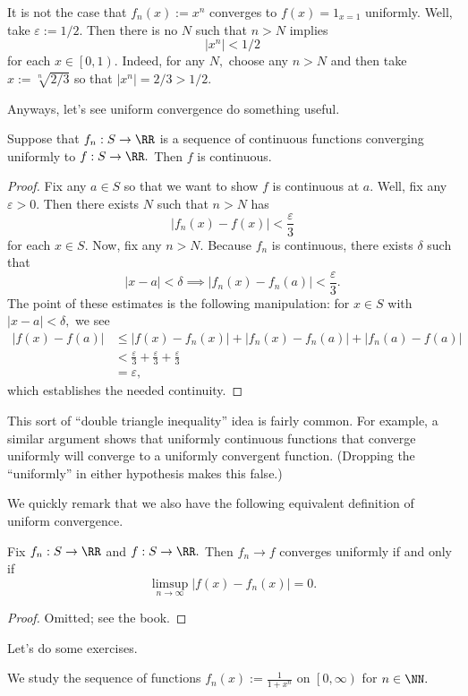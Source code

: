 \begin{nex}
	It is not the case that $f_n(x):=x^n$ converges to $f(x)=1_{x=1}$ uniformly. Well, take $\varepsilon:=1/2.$ Then there is no $N$ such that $n>N$ implies
	\[\left|x^n\right|<1/2\]
	for each $x\in\left[0,1\right).$ Indeed, for any $N,$ choose any $n>N$ and then take $x:=\sqrt[n]{2/3}$ so that $|x^n|=2/3>1/2.$
\end{nex}
Anyways, let's see uniform convergence do something useful.
\begin{proposition}
	Suppose that $f_n:S\to\RR$ is a sequence of continuous functions converging uniformly to $f:S\to\RR.$ Then $f$ is continuous.
\end{proposition}
\begin{proof}
	Fix any $a\in S$ so that we want to show $f$ is continuous at $a.$ Well, fix any $\varepsilon>0.$ Then there exists $N$ such that $n>N$ has
	\[|f_n(x)-f(x)|<\frac\varepsilon3\]
	for each $x\in S.$ Now, fix any $n>N.$ Because $f_n$ is continuous, there exists $\delta$ such that
	\[|x-a|<\delta\implies|f_n(x)-f_n(a)|<\frac\varepsilon3.\]
	The point of these estimates is the following manipulation: for $x\in S$ with $|x-a|<\delta,$ we see
	\begin{align*}
		|f(x)-f(a)| &\le |f(x)-f_n(x)|+|f_n(x)-f_n(a)|+|f_n(a)-f(a)| \\
		&< \frac\varepsilon3+\frac\varepsilon3+\frac\varepsilon3 \\
		&=\varepsilon,
	\end{align*}
	which establishes the needed continuity.
\end{proof}
\begin{remark}
	This sort of ``double triangle inequality'' idea is fairly common. For example, a similar argument shows that uniformly continuous functions that converge uniformly will converge to a uniformly convergent function. (Dropping the ``uniformly'' in either hypothesis makes this false.)
\end{remark}
We quickly remark that we also have the following equivalent definition of uniform convergence.
\begin{proposition}
	Fix $f_n:S\to\RR$ and $f:S\to\RR.$ Then $f_n\to f$ converges uniformly if and only if
	\[\limsup_{n\to\infty}|f(x)-f_n(x)|=0.\]
\end{proposition}
\begin{proof}
	Omitted; see the book.
\end{proof}
Let's do some exercises.
\begin{exercise}
	We study the sequence of functions $f_n(x):=\frac1{1+x^n}$ on $\left[0,\infty\right)$ for $n\in\NN.$
\end{exercise}
